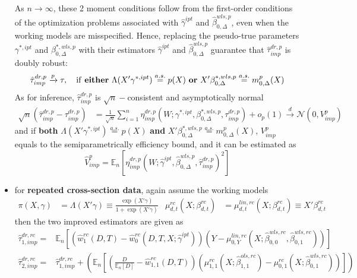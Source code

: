 \documentclass[twoside]{article}
\begin{document}
\begin{itemize}
    As $n\rightarrow \infty$, these 2 moment conditions follow from the first-order conditions of the optimization problems associated with $\hat{\gamma}^{ipt}$ and $\hat{\beta}^{wls,p}_{0,\Delta}$, even when the working models are misspecified. Hence, replacing the pseudo-true parameters $\gamma^{*,ipt}$ and $\beta^{*,wls,p}_{0,\Delta}$ with their estimators $\hat{\gamma}^{ipt}$ and $\hat{\beta}^{wls,p}_{0,\Delta}$ guarantee that $\hat{\tau}^{dr,p}_{imp}$ is doubly robust:
    $$
    \hat{\tau}^{dr,p}_{imp} \xrightarrow{p} \tau,\ \  \text{ if \textbf{either} $\Lambda(X'\gamma^{*,ipt})\overset{a.s.}{=}p(X)$ \textbf{or} $X'\beta^{*,wls,p}_{0,\Delta}\overset{a.s.}{=}m^p_{0,\Delta}(X)$}
    $$
    As for inference, $\hat{\tau}^{dr,p}_{imp}$ is $\sqrt{n}-$consistent and asymptotically normal
    \begin{align*}
        \sqrt{n}\left(\hat{\tau}^{dr,p}_{imp}-\tau^{dr,p}_{imp}\right) &= \frac{1}{\sqrt{n}} \sum^n_{i=1}\eta^{dr,p}_{imp} \left(W; \gamma^{*,ipt},\beta^{*,wls,p}_{0,\Delta},\tau^{dr,p}_{imp}\right) + o_p(1) \xrightarrow{d} \mathcal{N}\left(0,V^p_{imp}\right)
    \end{align*}
    and if \textbf{both}  $\Lambda(X'\gamma^{*,ipt})\overset{a.s.}{=}p(X)$ \textbf{and} $X'\beta^{*,wls,p}_{0,\Delta}\overset{a.s.}{=}m^p_{0,\Delta}(X)$, $V^p_{imp}$ equals to the semiparametrically efficiency bound, and it can be estimated as 
    \begin{equation*}
        \hat{V}^p_{imp} = \mathbb{E}_n\left[\eta^{dr,p}_{imp}\left(W;\hat{\gamma}^{ipt},\hat{\beta}^{wls,p}_{0,\Delta},\hat{\tau}^{dr,p}_{imp}\right)^2\right]
    \end{equation*}
    \item for \textbf{repeated cross-section data}, again assume the working models
    \begin{align*}
        \pi(X,\gamma) &= \Lambda\left(X'\gamma\right) \equiv \frac{\exp(X'\gamma)}{1+\exp (X'\gamma)} & \mu^{rc}_{d,t}\left(X;\beta^{rc}_{d,t}\right)&= \mu^{lin,rc}_{d,t}\left(X;\beta^{rc}_{d,t}\right)\equiv X'\beta^{rc}_{d,t}
    \end{align*}
    then the two improved estimators are given as 
    \begin{align*}
        \hat{\tau}^{dr,rc}_{1,imp} =& \mathbb{E}_n \left[ \left(\hat{w}^{rc}_1(D,T) - \hat{w}_0^{rc}\left(D,T,X;\hat{\gamma}^{ipt}\right) \right) \left(Y-\mu^{lin,rc}_{0,Y}\left(X;\hat{\beta}^{wls,rc}_{0,0},\hat{\beta}^{wls,rc}_{0,1}\right)\right) \right] \\
        \hat{\tau}^{dr,rc}_{2,imp} =& \hat{\tau}_{1,imp}^{dr,rc} + \left(\mathbb{E}_n \left[ \left( \frac{D}{\mathbb{E}_n[D]} -\hat{w}^{rc}_{1,1}(D,T) \right) \left(\mu^{rc}_{1,1}\left(X;\hat{\beta}^{ols,rc}_{1,1}\right) - \mu^{rc}_{0,1}\left(X;\hat{\beta}^{wls,rc}_{0,1}\right)\right) \right]\right) \\

\end{align*}
\end{itemize}
\end{document}
